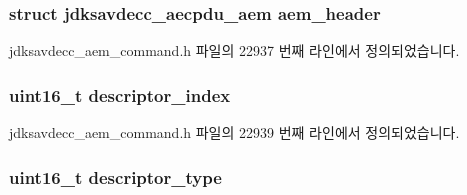\subsubsection[{\texorpdfstring{aem\+\_\+header}{aem_header}}]{\setlength{\rightskip}{0pt plus 5cm}struct {\bf jdksavdecc\+\_\+aecpdu\+\_\+aem} aem\+\_\+header}\hypertarget{structjdksavdecc__aem__command__get__matrix__response_ae1e77ccb75ff5021ad923221eab38294}{}\label{structjdksavdecc__aem__command__get__matrix__response_ae1e77ccb75ff5021ad923221eab38294}


jdksavdecc\+\_\+aem\+\_\+command.\+h 파일의 22937 번째 라인에서 정의되었습니다.

\subsubsection[{\texorpdfstring{descriptor\+\_\+index}{descriptor_index}}]{\setlength{\rightskip}{0pt plus 5cm}uint16\+\_\+t descriptor\+\_\+index}\hypertarget{structjdksavdecc__aem__command__get__matrix__response_a042bbc76d835b82d27c1932431ee38d4}{}\label{structjdksavdecc__aem__command__get__matrix__response_a042bbc76d835b82d27c1932431ee38d4}


jdksavdecc\+\_\+aem\+\_\+command.\+h 파일의 22939 번째 라인에서 정의되었습니다.

\subsubsection[{\texorpdfstring{descriptor\+\_\+type}{descriptor_type}}]{\setlength{\rightskip}{0pt plus 5cm}uint16\+\_\+t descriptor\+\_\+type}\hypertarget{structjdksavdecc__aem__command__get__matrix__response_ab7c32b6c7131c13d4ea3b7ee2f09b78d}{}\label{structjdksavdecc__aem__command__get__matrix__response_ab7c32b6c7131c13d4ea3b7ee2f09b78d}


